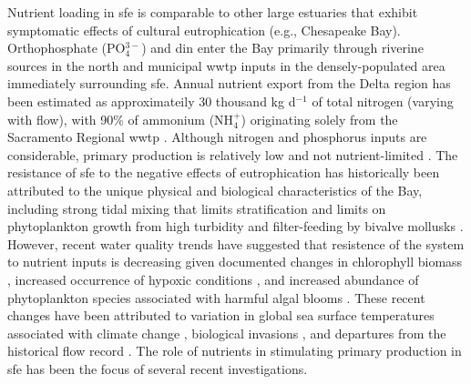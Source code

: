 \documentclass[journal = esthag, manuscript = article]{achemso}\usepackage[]{graphicx}\usepackage[]{color}
\begin{document}
Nutrient loading in \ac{sfe} is comparable to other large estuaries that exhibit symptomatic effects of cultural eutrophication (e.g., Chesapeake Bay).\cite{Kemp05}  Orthophosphate (PO$_4^{3-}$) and \ac{din} enter the Bay primarily through riverine sources in the north and municipal \ac{wwtp} inputs in the densely-populated area immediately surrounding \ac{sfe}.  Annual nutrient export from the Delta region has been estimated as approximateily 30 thousand kg d$^{-1}$ of total nitrogen (varying with flow\cite{Novick15}), with 90\% of ammonium (NH$_4^{+}$) originating solely from the Sacramento Regional \ac{wwtp} \cite{Jassby08}.  Although nitrogen and phosphorus inputs are considerable, primary production is relatively low and not nutrient-limited \cite{Jassby02,Kimmerer12}.  The resistance of \ac{sfe} to the negative effects of eutrophication has historically been attributed to the unique physical and biological characteristics of the Bay, including strong tidal mixing that limits stratification \cite{Cloern96,Thompson08} and limits on phytoplankton growth from high turbidity and filter-feeding by bivalve mollusks \cite{Thompson08,Crauder16}.  However, recent water quality trends have suggested that resistence of the system to nutrient inputs is decreasing given documented changes in chlorophyll biomass \cite{Cloern07}, increased occurrence of hypoxic conditions \cite{SutulaIR}, and increased abundance of phytoplankton species associated with harmful algal blooms \cite{Lehman05,Lehman10}.  These recent changes have been attributed to variation in global sea surface temperatures associated with climate change \cite{Cloern07}, biological invasions \cite{Cohen98}, and departures from the historical flow record \cite{Enright09,Cloern12b}.  The role of nutrients in stimulating primary production in \ac{sfe} has been the focus of several recent investigations.\cite{Dugdale07,Parker12,Glibert14}
\end{document}
